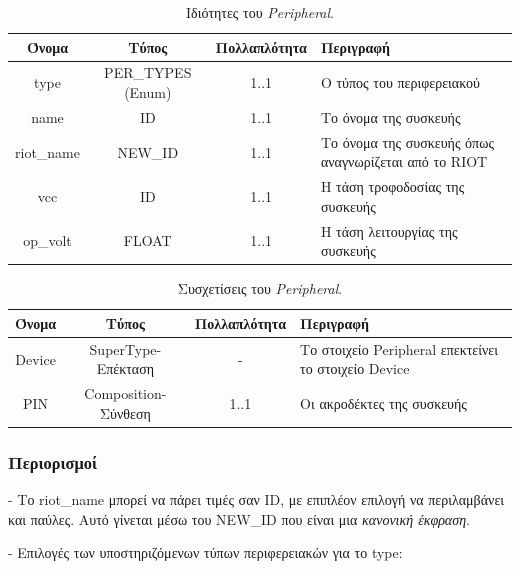 \begin{table}[H]
	\begin{center}
		\caption{Ιδιότητες του \textit{Peripheral}.}
		\label{tab:peripheral1}
		\begin{tabular}{ | c | c | c| m{5.5cm} | }
			\hline
			\rowcolor{Gray}
			Όνομα & Τύπος & Πολλαπλότητα & Περιγραφή \\
			\hline
			type & PER\_TYPES (Enum) & 1..1 &  Ο τύπος του περιφερειακού \\
			\hline
			name & ID & 1..1 &  Το όνομα της συσκευής \\
			\hline
			riot\_name & NEW\_ID & 1..1 &  Το όνομα της συσκευής όπως αναγνωρίζεται από το RIOT \\
			\hline
			vcc & ID & 1..1 & Η τάση τροφοδοσίας της συσκευής \\
			\hline
			op\_volt & FLOAT & 1..1 &  Η τάση λειτουργίας της συσκευής \\
			\hline
		\end{tabular}
	\end{center}
\end{table}

\begin{table}[H]
	\begin{center}
		\caption{Συσχετίσεις του \textit{Peripheral}.}
		\label{tab:peripheral2}
		\begin{tabular}{ | c | c | c| m{5.5cm} | }
			\hline
			\rowcolor{Gray}
			Όνομα & Τύπος & Πολλαπλότητα & Περιγραφή \\
			\hline
			Device & SuperType-Επέκταση & - &  Το στοιχείο Peripheral επεκτείνει το στοιχείο Device \\
			\hline
			PIN & Composition-Σύνθεση & 1..1 &  Οι ακροδέκτες της συσκευής \\
			\hline
		\end{tabular}
	\end{center}
\end{table}

\subsubsection*{Περιορισμοί}

\noindent - Το riot\_name μπορεί να πάρει τιμές σαν ID, με επιπλέον επιλογή να περιλαμβάνει και παύλες. Αυτό γίνεται μέσω του NEW\_ID που είναι μια \textit{κανονική έκφραση}.

\noindent - Επιλογές των υποστηριζόμενων τύπων περιφερειακών για το type:

